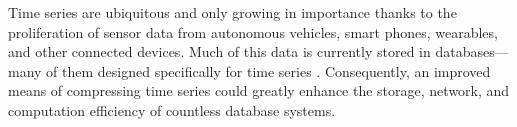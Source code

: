 




Time series are ubiquitous and only growing in importance thanks to the proliferation of sensor data from autonomous vehicles, smart phones, wearables, and other connected devices. Much of this data is currently stored in databases---many of them designed specifically for time series \cite{respawnDB, openTSDB, chronicleDB, kairosDB, druid, influxDB, gorilla}. Consequently, an improved means of compressing time series could greatly enhance the storage, network, and computation efficiency of countless database systems.






